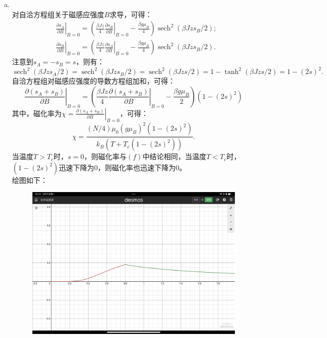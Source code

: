 \documentclass[reqno,a4paper,12pt]{amsart}
\DeclareMathOperator{\sech}{sech}
\begin{document}
\begin{enumerate}[1.]
\begin{tcolorbox}[breakable, colframe = black, colback = black!5!white]
\begin{enumerate}[(a)]
\item \color{blue}{答案思路太妙了} \\
\color{black}
对自洽方程组关于磁感应强度$B$求导，可得：
\begin{align*}
	&\left. \frac{\partial s_A}{\partial B} \right\vert_{B=0} = \left( \left. \frac{\beta Jz}{4}\frac{\partial s_B}{\partial B} \right\vert_{B=0} - \frac{\beta g\mu_B}{4} \right) \sech^2(\beta Jzs_B/2); \\
	&\left. \frac{\partial s_B}{\partial B} \right\vert_{B=0} = \left( \left. \frac{\beta Jz}{4}\frac{\partial s_A}{\partial B} \right\vert_{B=0} - \frac{\beta g\mu_B}{4} \right) \sech^2(\beta Jzs_B/2).
\end{align*}
注意到$s_A = -s_B = s$，则有：
\[
	\sech^2(\beta Jzs_A/2) = \sech^2(\beta Jzs_B/2) = \sech^2(\beta Jzs/2) = 1 - \tanh^2(\beta Jzs/2) = 1-(2s)^2.
\]
自洽方程组对磁感应强度的导数方程组加和，可得：
\[
	\left. \frac{\partial (s_A + s_B)}{\partial B} \right\vert_{B=0} = \left( \frac{\beta Jz}{4}\left. \frac{\partial (s_A + s_B)}{\partial B} \right\vert_{B=0} - \frac{\beta g\mu_B}{2} \right) (1-(2s)^2)
\]
其中，磁化率为$\chi = \left. \frac{\partial (s_A + s_B)}{\partial B} \right\vert_{B=0}$，可得：
\[
	\chi = \frac{(N/4)\mu_0(g\mu_B)^2(1-(2s)^2)}{k_B(T+T_c(1-(2s)^2))}.
\]
当温度$T>T_c$时，$s=0$，则磁化率与$(f)$中结论相同，当温度$T<T_c$时，$(1-(2s)^2)$迅速下降为0，则磁化率也迅速下降为0。 \\
绘图如下：
\begin{figure}[H]
	\centering
	\includegraphics[width = 120mm]{22.5.jpeg}
	\caption{}
\end{figure}



\end{enumerate}
\end{tcolorbox}


\end{enumerate}
\end{document}
